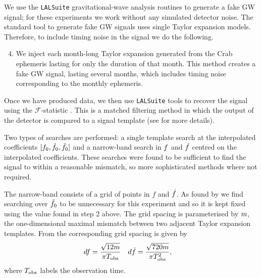\documentclass[../full_thesis/full_thesis.tex]{subfiles}
\begin{document}
We use the \verb+LALSuite+ \cite{lalsuite} gravitational-wave analysis routines
to generate a fake GW signal; for these experiments we work
without any simulated detector noise. The standard tool to generate fake GW
signals uses single Taylor expansion models. Therefore, to include timing noise
in the signal we do the following.

\begin{enumerate}
\setcounter{enumi}{3}

\item We inject each month-long Taylor expansion generated from the Crab ephemeris
lasting for only the duration of that month.
This
method creates a fake GW signal, lasting several months, which includes timing noise corresponding to the monthly
ephemeris.

\end{enumerate}

Once we have produced data, we then use \verb+LALSuite+ tools to recover the
signal using the $\mathcal{F}$-statistic \citep{Jaranowski1998}. This is a
matched filtering method in which the output of the detector is compared to a
signal template (see \citet{Prix2009} for more details).

Two types of searches are performed: a single
template search at the interpolated coefficients $[f_{0}, \dot{f}_{0},
\ddot{f}_{0}]$ and a narrow-band search in $f$ and $\dot{f}$ centred on the
interpolated coefficients. These searches were found to be sufficient
to find the signal to within a reasonable mismatch, so more sophisticated
methods where not required.

The narrow-band consists of a grid of points in
$f$ and $\dot{f}$. As found by \citet{ligo2008} we find searching over
$\ddot{f}_{0}$ to be unnecessary for this experiment and so it is kept fixed using
the value found in step 2 above.
 The grid spacing is parameterised
by $m$, the one-dimensional maximal mismatch between two adjacent Taylor
expansion templates. From
\citet{ligo2013_EAH} the corresponding grid spacing is given by
\begin{align}
    df = \frac{\sqrt{12 m}}{\pi T_{\textrm{obs}}} &&&
    d\dot{f} = \frac{\sqrt{720 m}}{\pi T_{\textrm{obs}}^{2}},
\label{eqn: Grid spacing}
\end{align}
where $T_{\textrm{obs}}$ labels the observation time.
\end{document}
